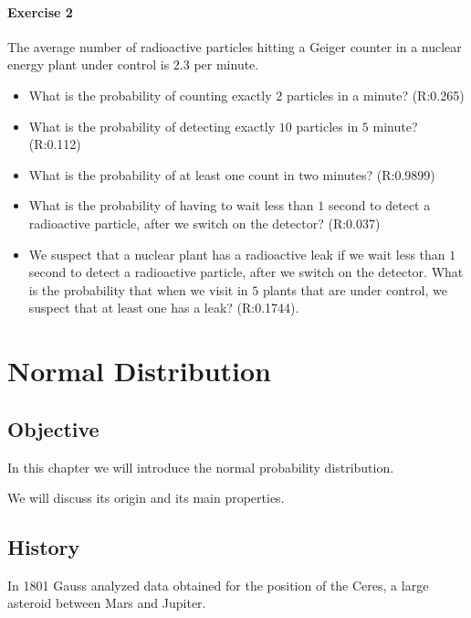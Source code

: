 \documentclass[
]{book}
\begin{document}
\hypertarget{exercise-2-5}{%
\subsubsection{Exercise 2}\label{exercise-2-5}}

The average number of radioactive particles hitting a Geiger counter in a nuclear energy plant under control is \(2.3\) per minute.

\begin{itemize}
\item
  What is the probability of counting exactly \(2\) particles in a minute? (R:0.265)
\item
  What is the probability of detecting exactly \(10\) particles in \(5\) minute? (R:0.112)
\item
  What is the probability of at least one count in two minutes? (R:0.9899)
\item
  What is the probability of having to wait less than \(1\) second to detect a radioactive particle, after we switch on the detector? (R:0.037)
\item
  We suspect that a nuclear plant has a radioactive leak if we wait less than \(1\) second to detect a radioactive particle, after we switch on the detector. What is the probability that when we visit in \(5\) plants that are under control, we suspect that at least one has a leak? (R:0.1744).
\end{itemize}

\hypertarget{normal-distribution}{%
\chapter{Normal Distribution}\label{normal-distribution}}

\hypertarget{objective-4}{%
\section{Objective}\label{objective-4}}

In this chapter we will introduce the normal probability distribution.

We will discuss its origin and its main properties.

\hypertarget{history}{%
\section{History}\label{history}}

In 1801 Gauss analyzed data obtained for the position of the Ceres, a large asteroid between Mars and Jupiter.
\end{document}
